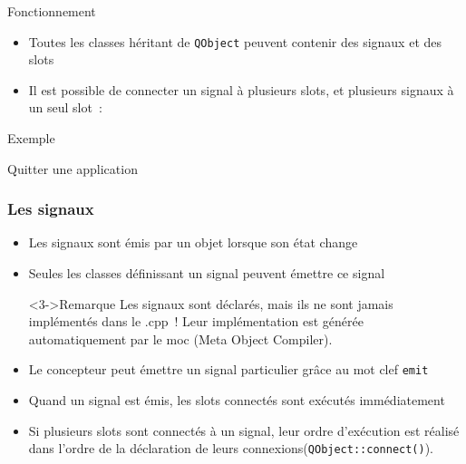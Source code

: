 \documentclass{beamer} %
\begin{document}
\begin{frame}{Fonctionnement}

	\begin{itemize}
	\item Toutes les classes héritant de \texttt{QObject} peuvent contenir des signaux et des slots
	\item<2-> Il est possible de connecter un signal à plusieurs slots, et plusieurs signaux à un seul slot~:
	\end{itemize}

\end{frame}

\begin{frame}{Exemple}
	\begin{exampleblock}{Quitter une application}
		
	\end{exampleblock}
\end{frame}

\begin{frame}
	\frametitle{Les signaux}
	
	\begin{itemize}
	\item Les signaux sont émis par un objet lorsque son état change
	\item<2-> Seules les classes définissant un signal peuvent émettre \alert{ce} signal
	
	\begin{alertblock}<3->{Remarque}
	Les signaux sont déclarés, mais ils ne sont jamais implémentés dans le .cpp~! Leur implémentation est générée automatiquement par le moc (Meta Object Compiler).
	\end{alertblock}
	
	\item<4-> Le concepteur peut émettre un signal particulier grâce au mot clef \texttt{emit}
	\item<5-> Quand un signal est émis, les slots connectés sont exécutés immédiatement
	\item<6-> Si plusieurs slots sont connectés à un signal, leur ordre d'exécution est réalisé dans l'ordre de la déclaration de leurs connexions(\texttt{QObject::connect()}).
	\end{itemize}
\end{frame}
\end{document}
